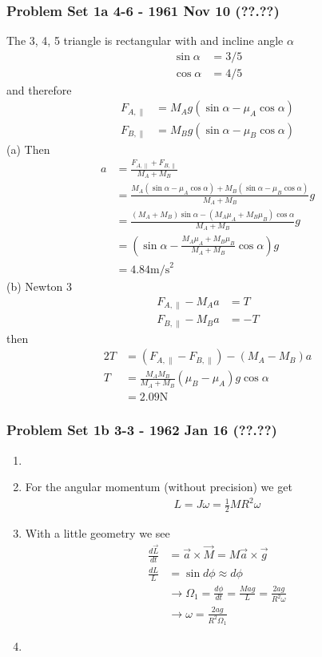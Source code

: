 \documentclass[10pt,a4paper]{article}
\theoremstyle{definition}
\begin{document}
\subsubsection{Problem Set 1a 4-6 - 1961 Nov 10 (??.??)}
The 3, 4, 5 triangle is rectangular with and incline angle $\alpha$
\begin{align}
\sin\alpha&=3/5\\
\cos\alpha&=4/5
\end{align}
and therefore
\begin{align}
F_{A,\parallel}&=M_Ag(\sin\alpha-\mu_A\cos\alpha)\\
F_{B,\parallel}&=M_Bg(\sin\alpha-\mu_B\cos\alpha)
\end{align}
(a) Then
\begin{align}
a
&=\frac{F_{A,\parallel}+F_{B,\parallel}}{M_A+M_B}\\
&=\frac{M_A(\sin\alpha-\mu_A\cos\alpha)+M_B(\sin\alpha-\mu_B\cos\alpha)}{M_A+M_B}g\\
&=\frac{(M_A+M_B)\sin\alpha-(M_A\mu_A+M_B\mu_B)\cos\alpha}{M_A+M_B}g\\
&=\left(\sin\alpha-\frac{M_A\mu_A+M_B\mu_B}{M_A+M_B}\cos\alpha\right)g\\
&=4.84\text{m/s}^2
\end{align}
(b) Newton 3
\begin{align}
F_{A,\parallel}-M_Aa&=T\\
F_{B,\parallel}-M_Ba&=-T
\end{align}
then
\begin{align}
2T
&=(F_{A,\parallel}-F_{B,\parallel})-(M_A-M_B)a\\
T&=\frac{M_AM_B}{M_A+M_B}(\mu_B-\mu_A)g\cos\alpha\\
&=2.09\text{N}
\end{align}


\subsubsection{Problem Set 1b 3-3 - 1962 Jan 16 (??.??)}
\begin{enumerate}
    \item 
    \item For the angular momentum (without precision) we get
    \begin{align}
        L=J\omega=\frac{1}{2}MR^2\omega
    \end{align}
    \item With a little geometry we see
    \begin{align}
        \frac{d\vec{L}}{dt}&=\vec{a}\times\vec{M}=M\vec{a}\times\vec{g}\\
        \frac{dL}{L}&=\sin d\phi\approx d\phi\\
        &\rightarrow\Omega_1=\frac{d\phi}{dt}=\frac{Mag}{L}=\frac{2ag}{R^2\omega}\\
        &\rightarrow\omega=\frac{2ag}{R^2\Omega_1}
    \end{align}
    \item
\end{enumerate}
\end{document}
